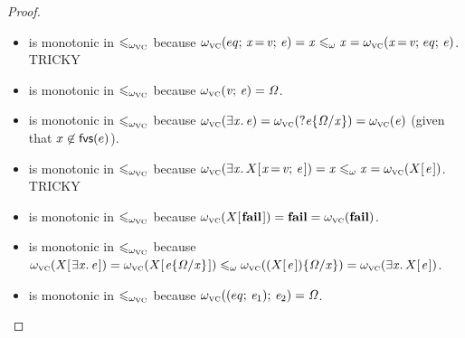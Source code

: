 \begin{proof}
\begin{itemize}
\item {} is monotonic in $\mathrel{\leqslant_{\omega_{\scriptscriptstyle\mathrm{VC}}}}$ \hfill\break
because $\omega_{\scriptscriptstyle\mathrm{VC}}(eq;\,\mathit{x}\hspace{-0.14em}=\hspace{-0.14em}\mathit{v};\,\mathit{e}) = \mathit{x} \mathrel{\leqslant_\omega} \mathit{x} = \omega_{\scriptscriptstyle\mathrm{VC}}(\mathit{x}\hspace{-0.14em}=\hspace{-0.14em}\mathit{v};\,eq;\,\mathit{e})$.  {\color{red} TRICKY}

\item {} is monotonic in $\mathrel{\leqslant_{\omega_{\scriptscriptstyle\mathrm{VC}}}}$
because $\omega_{\scriptscriptstyle\mathrm{VC}}(\mathit{v};\,\mathit{e}) = \mathit{\Omega}$.

\item {} is monotonic in $\mathrel{\leqslant_{\omega_{\scriptscriptstyle\mathrm{VC}}}}$ \hfill\break
because $\omega_{\scriptscriptstyle\mathrm{VC}}(\exists\mathit{x}.\,\mathit{e}) = \omega_{\scriptscriptstyle\mathrm{VC}}(?\mathit{e}\{\mathit{\Omega}/\mathit{x}\}) = \omega_{\scriptscriptstyle\mathrm{VC}}(\mathit{e})$ (given that $x \not\in \mathsf{fvs}(e)$).

\item {} is monotonic in $\mathrel{\leqslant_{\omega_{\scriptscriptstyle\mathrm{VC}}}}$ \hfill\break
because $\omega_{\scriptscriptstyle\mathrm{VC}}(\exists\mathit{x}.\,X [\mskip1.5mu \mathit{x}\hspace{-0.14em}=\hspace{-0.14em}\mathit{v};\,\mathit{e}\mskip1.5mu]) = \mathit{x} \mathrel{\leqslant_\omega} \mathit{x} = \omega_{\scriptscriptstyle\mathrm{VC}}(X [\mskip1.5mu \mathit{e}\mskip1.5mu])$.   {\color{red} TRICKY}

\item {} is monotonic in $\mathrel{\leqslant_{\omega_{\scriptscriptstyle\mathrm{VC}}}}$
because $\omega_{\scriptscriptstyle\mathrm{VC}}(X [\mskip1.5mu \textbf{fail}\mskip1.5mu]) = \textbf{fail} = \omega_{\scriptscriptstyle\mathrm{VC}}(\textbf{fail})$.

\item {} is monotonic in $\mathrel{\leqslant_{\omega_{\scriptscriptstyle\mathrm{VC}}}}$ \hfill\break
because $\omega_{\scriptscriptstyle\mathrm{VC}}(X [\mskip1.5mu \exists\mathit{x}.\,\mathit{e}\mskip1.5mu]) = \omega_{\scriptscriptstyle\mathrm{VC}}(X [\mskip1.5mu \mathit{e}\{\mathit{\Omega}/\mathit{x}\}\mskip1.5mu]) \mathrel{\leqslant_\omega} \omega_{\scriptscriptstyle\mathrm{VC}}((X [\mskip1.5mu \mathit{e}\mskip1.5mu])\{\mathit{\Omega}/\mathit{x}\}) = \omega_{\scriptscriptstyle\mathrm{VC}}(\exists\mathit{x}.\,X [\mskip1.5mu \mathit{e}\mskip1.5mu])$.

\item {} is monotonic in $\mathrel{\leqslant_{\omega_{\scriptscriptstyle\mathrm{VC}}}}$
because $\omega_{\scriptscriptstyle\mathrm{VC}}((eq;\,\mathit{e}_{\mathrm{1}});\,\mathit{e}_{\mathrm{2}}) = \mathit{\Omega}$.


\end{itemize}
\end{proof}
